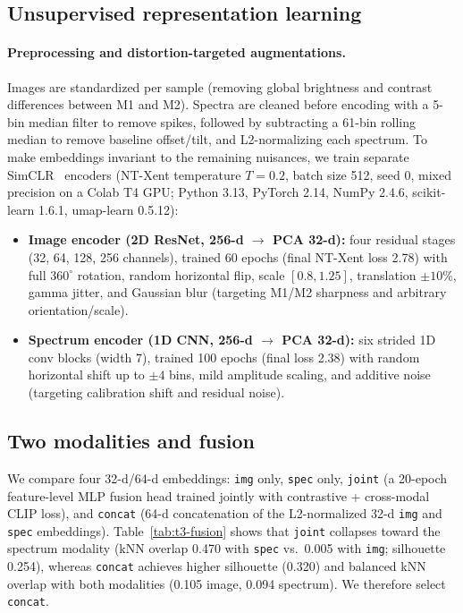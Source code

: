 \subsection{Unsupervised representation learning}
\label{sec:t3-ssl}

\paragraph{Preprocessing and distortion-targeted augmentations.} Images are standardized per sample
(removing global brightness and contrast differences between M1 and M2). Spectra are cleaned before
encoding with a 5-bin median filter to remove spikes, followed by subtracting a 61-bin rolling
median to remove baseline offset/tilt, and L2-normalizing each spectrum. To make embeddings
invariant to the remaining nuisances, we train separate SimCLR~\cite{chen2020simclr} encoders
(NT-Xent temperature $T=0.2$, batch size 512, seed 0, mixed precision on a Colab T4 GPU; Python
3.13, PyTorch 2.14, NumPy 2.4.6, scikit-learn 1.6.1, umap-learn 0.5.12):
\begin{itemize}
  \item \textbf{Image encoder (2D ResNet, 256-d $\to$ PCA 32-d):} four residual stages (32, 64, 128,
  256 channels), trained 60 epochs (final NT-Xent loss 2.78) with full $360^\circ$ rotation, random
  horizontal flip, scale $[0.8, 1.25]$, translation $\pm 10\%$, gamma jitter, and Gaussian blur
  (targeting M1/M2 sharpness and arbitrary orientation/scale).
  \item \textbf{Spectrum encoder (1D CNN, 256-d $\to$ PCA 32-d):} six strided 1D conv blocks
  (width 7), trained 100 epochs (final loss 2.38) with random horizontal shift up to $\pm 4$ bins,
  mild amplitude scaling, and additive noise (targeting calibration shift and residual noise).
\end{itemize}

\subsection{Two modalities and fusion}
\label{sec:t3-fusion}

We compare four 32-d/64-d embeddings: \texttt{img} only, \texttt{spec} only, \texttt{joint}
(a 20-epoch feature-level MLP fusion head trained jointly with contrastive + cross-modal CLIP
loss), and \texttt{concat} (64-d concatenation of the L2-normalized 32-d \texttt{img} and
\texttt{spec} embeddings). Table~\ref{tab:t3-fusion} shows that \texttt{joint} collapses toward the
spectrum modality (kNN overlap 0.470 with \texttt{spec} vs.\ 0.005 with \texttt{img}; silhouette
0.254), whereas \texttt{concat} achieves higher silhouette (0.320) and balanced kNN overlap with
both modalities (0.105 image, 0.094 spectrum). We therefore select \texttt{concat}.

